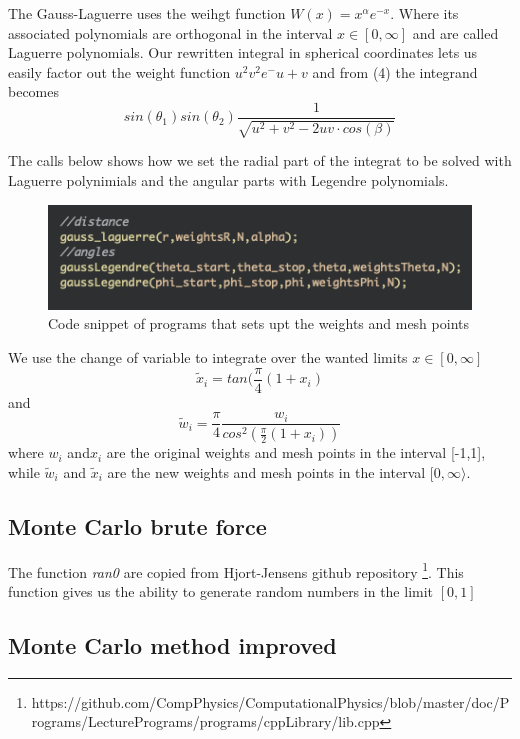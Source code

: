 \documentclass[twoside,twocolumn]{article}
\begin{document}
The Gauss-Laguerre uses the weihgt function $W(x)  = x^\alpha e^{-x}$. Where its associated polynomials are orthogonal in the interval $x\in[0,\infty]$ and are called Laguerre polynomials. Our rewritten integral in spherical coordinates lets us easily factor out the weight function $u^2v^2 e^-{u+v}$ and from (4) the integrand becomes
\begin{equation}
sin(\theta_1)sin(\theta_2)\frac{1}{\sqrt{u^2+v^2-2uv \cdot cos(\beta)}}
\end{equation}

The calls below shows how we set the radial part of the integrat to be solved with Laguerre polynimials and the angular parts with Legendre polynomials.
\begin{figure}[h]
\center
\includegraphics[scale=0.55]{Laguerre.png}
\caption{Code snippet of programs that sets upt the weights and mesh points}
\end{figure}

We use the change of variable to integrate over the wanted limits $x\in[0,\infty]$
\begin{equation}
	\tilde{x}_i = tan(\frac{\pi}{4}(1+x_i)
\end{equation}
and
\begin{equation}
	\tilde{w}_i = \frac{\pi}{4}\frac{w_i}{cos^2({\frac{\pi}{2}(1+x_i)})}
\end{equation}
where $w_i$ and$x_i$ are the original weights and mesh points in the interval [-1,1], while $\tilde{w}_i$ and $\tilde{x}_i$ are the new weights and mesh points in the interval $[0,\infty\rangle$.

\subsection{Monte Carlo brute force}
The function \textit{ran0}  are copied from Hjort-Jensens github repository \footnote{https://github.com/CompPhysics/ComputationalPhysics/blob/master/doc/Programs/LecturePrograms/programs/cppLibrary/lib.cpp}. This function gives us the ability to generate random numbers in the limit $[0,1]$
\subsection{Monte Carlo method improved}
\end{document}
